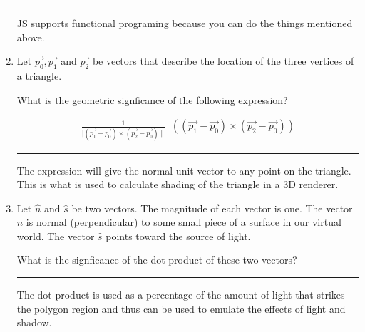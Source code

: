 \documentclass[oneside]{article}
\newenvironment{answer}
  {\vspace*{0.2cm} \rule{12cm}{0.02cm} \vspace*{0.2cm}}
  {\vspace*{0.2cm}}
\begin{document}
\begin{enumerate}
  \begin{answer}

    JS supports functional programing because you can do the things mentioned above.

    \end{answer}

  \item Let $\vec{p_0}, \vec{p_1}$ and $\vec{p_2}$ be vectors that
    describe the location of the three vertices of a triangle.

    What is the geometric signficance of the following expression?

  \begin{align*}
    \frac{1}{\mid (\vec{p_1} - \vec{p_0}) \times (\vec{p_2} - \vec{p_0}) \mid}
    \;\;
    ((\vec{p_1} - \vec{p_0}) \times (\vec{p_2} - \vec{p_0}))
    \end{align*}

  \begin{answer}

    The expression will give the normal unit vector to any point on the triangle. This is what is
    used to calculate shading of the triangle in a 3D renderer.

    \end{answer}

  \item Let $\hat{n}$ and $\hat{s}$ be two vectors. The magnitude
    of each vector is one. The vector $\hat{n}$ is normal (perpendicular)
    to some small piece of a surface in our virtual world.
    The vector $\hat{s}$ points toward the source of light.

    What is the signficance of the dot product of these two vectors?

  \begin{answer}

    The dot product is used as a percentage of the amount of light that strikes
    the polygon region and thus can be used to emulate the effects of light and shadow.

    \end{answer}

  \end{enumerate}
\end{document}
